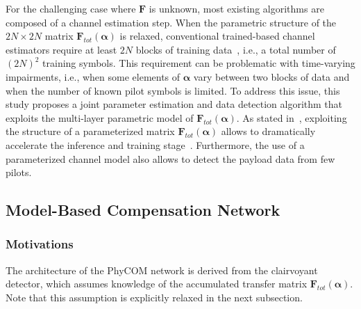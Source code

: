 \documentclass{article}
\begin{document}
For the challenging case where $\mathbf{F}$ is unknown, most existing algorithms are composed of a channel estimation step. When the parametric structure of the $2N\times 2N$ matrix $\mathbf{F}_{tot}(\boldsymbol \alpha)$ is relaxed, conventional trained-based channel estimators require at least $2N$ blocks of training data~\cite{BIG06}, i.e., a total number of $(2N)^2$ training symbols. This requirement can be problematic with time-varying impairments, i.e., when some elements of $\boldsymbol \alpha$ vary between two blocks of data and when the number of known pilot symbols is limited. To address this issue, this study proposes a joint parameter estimation and data detection algorithm that exploits the multi-layer parametric model of $\mathbf{F}_{tot}(\boldsymbol \alpha)$. As stated in~\cite{CHE17}, exploiting the structure of a parameterized matrix $\mathbf{F}_{tot}(\boldsymbol \alpha)$ allows to dramatically accelerate the inference and training stage~\cite{CHE17}. Furthermore, the use of a parameterized channel model also allows to detect the payload data from few pilots.

\subsection{Model-Based Compensation Network}

\subsubsection{Motivations}
The architecture of the PhyCOM network is derived from the clairvoyant detector, which assumes knowledge of the accumulated transfer matrix $\mathbf{F}_{tot}(\boldsymbol \alpha)$. Note that this assumption is explicitly relaxed in the next subsection.
\end{document}
